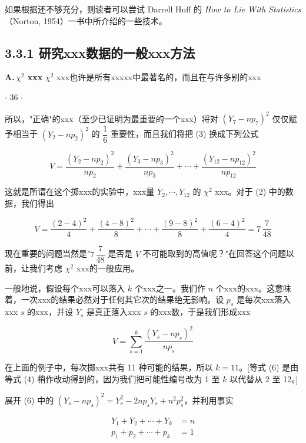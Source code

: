 如果根据还不够充分，则读者可以尝试 Darrell Huff 的 \textit{How to Lie With Statistics}（Norton, 1954）一书中所介绍的一些技术。

\subsection*{3.3.1 \quad 研究xxx数据的一般xxx方法}

\noindent \textbf{A.\,$\chi^2$ xxx} \quad $\chi^2$ xxx也许是所有xxxxx中最著名的，而且在与许多别的xxx

\begin{flushright}
$\cdot$ 36 $\cdot$
\end{flushright}

\noindent 所以，"正确"的xxx（至少已证明为最重要的一个xxx）将对 $(Y_7 - np_7)^2$ 仅仅赋予相当于 $(Y_2 - np_2)^2$ 的 $\dfrac{1}{6}$ 重要性，而且我们将把 (3) 换成下列公式

\begin{equation}
V = \frac{(Y_2 - np_2)^2}{np_2} + \frac{(Y_3 - np_3)^2}{np_3} + \cdots + \frac{(Y_{12} - np_{12})^2}{np_{12}} \tag{4}
\end{equation}

这就是所谓在这个掷xxx的实验中，xxx量 $Y_2, \cdots, Y_{12}$ 的 $\chi^2$ xxx。对于 (2) 中的数据，我们得出

\begin{equation}
V = \frac{(2-4)^2}{4} + \frac{(4-8)^2}{8} + \cdots + \frac{(9-8)^2}{8} + \frac{(6-4)^2}{4} = 7\,\frac{7}{48} \tag{5}
\end{equation}

现在重要的问题当然是"$7\,\dfrac{7}{48}$ 是否是 $V$ 不可能取到的高值呢？"在回答这个问题以前，让我们考虑 $\chi^2$ xxx的一般应用。

一般地说，假设每个xxx可以落入 $k$ 个xxx之一。我们作 $n$ 个xxx的xxx。这意味着，一次xxx的结果必然对于任何其它次的结果绝无影响。设 $p_s$ 是每次xxx落入xxx $s$ 的xxx，并设 $Y_s$ 是真正落入xxx $s$ 的xxx数，于是我们形成xxx

\begin{equation}
V = \sum_{s=1}^{k} \frac{(Y_s - np_s)^2}{np_s} \tag{6}
\end{equation}

在上面的例子中，每次掷xxx共有 11 种可能的结果，所以 $k = 11$。[等式 (6) 是由等式 (4) 稍作改动得到的，因为我们把可能性编号改为 1 至 $k$ 以代替从 2 至 12。]

展开 (6) 中的 $(Y_s - np_s)^2 = Y_s^2 - 2np_s Y_s + n^2 p_s^2$，并利用事实

\begin{equation}
\begin{aligned}
Y_1 + Y_2 + \cdots + Y_k &= n \\
p_1 + p_2 + \cdots + p_k &= 1
\end{aligned} \tag{7}
\end{equation}


